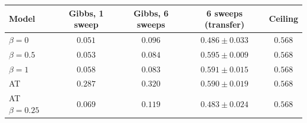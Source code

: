 \begin{tabular}{lcccc}
\toprule
Model & Gibbs, 1 sweep & Gibbs, 6 sweeps & 6 sweeps (transfer) & Ceiling \\
\midrule
$\beta=0$ & $0.051$ & $0.096$ & $0.486 \pm 0.033$ & $0.568$ \\
$\beta=0.5$ & $0.053$ & $0.084$ & $0.595 \pm 0.009$ & $0.568$ \\
$\beta=1$ & $0.058$ & $0.083$ & $0.591 \pm 0.015$ & $0.568$ \\
AT & $\mathbf{0.287}$ & $\mathbf{0.320}$ & $0.590 \pm 0.019$ & $0.568$ \\
AT $\beta=0.25$ & $0.069$ & $0.119$ & $0.483 \pm 0.024$ & $0.568$ \\
\bottomrule
\end{tabular}
